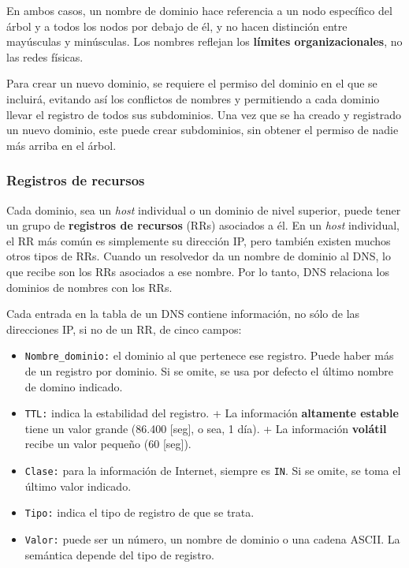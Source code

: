 \documentclass[10pt,a4paper]{article}
\begin{document}
En ambos casos, un nombre de dominio hace referencia a un nodo específico del árbol y a todos los nodos por debajo de él, y no hacen distinción entre mayúsculas y minúsculas. Los nombres reflejan los \textbf{límites organizacionales}, no las redes físicas.

Para crear un nuevo dominio, se requiere el permiso del dominio en el que se incluirá, evitando así los conflictos de nombres y permitiendo a cada dominio llevar el registro de todos sus subdominios. Una vez que se ha creado y registrado un nuevo dominio, este puede crear subdominios, sin obtener el permiso de nadie más arriba en el árbol.

\subsubsection{Registros de recursos}

Cada dominio, sea un \textit{host} individual o un dominio de nivel superior, puede tener un grupo de \textbf{registros de recursos} (RRs) asociados a él. En un \textit{host} individual, el RR más común es simplemente su dirección IP, pero también existen muchos otros tipos de RRs. Cuando un resolvedor da un nombre de dominio al DNS, lo que recibe son los RRs asociados a ese nombre. Por lo tanto, DNS relaciona los dominios de nombres con los RRs.

Cada entrada en la tabla de un DNS contiene información, no sólo de las direcciones IP, si no de un RR, de cinco campos:

\begin{itemize}
\item \texttt{Nombre\_dominio:} el dominio al que pertenece ese registro. Puede haber más de un registro por dominio. Si se omite, se usa por defecto el último nombre de domino
indicado.
\item \texttt{TTL:} indica la estabilidad del registro.
\subitem + La información \textbf{altamente estable} tiene un valor grande (86.400 [seg], o sea, 1 día).
\subitem + La información \textbf{volátil} recibe un valor pequeño (60 [seg]).
\item \texttt{Clase:} para la información de Internet, siempre es \texttt{IN}. Si se omite, se toma el último valor indicado.
\item \texttt{Tipo:} indica el tipo de registro de que se trata.
\item \texttt{Valor:} puede ser un número, un nombre de dominio o una cadena ASCII. La semántica depende del tipo de registro.
\end{itemize}
\end{document}
